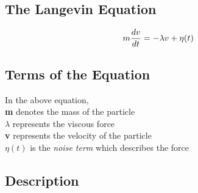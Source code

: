 \subsection{The Langevin Equation}
\begin{equation}
	{\LARGE{{m \frac{dv}{dt} = -\lambda v + \eta(t)}}}
	\label{eq:1}
\end{equation}
\subsection{Terms of the Equation}

{\normalsize{In the above equation,}}\\
{\normalsize {\textbf{m} denotes the mass of the particle }}\\
{\normalsize {\textbf{$ \lambda $ } represents the viscous force }}\\
{\normalsize {\textbf{v} represents the velocity of the particle }}\\
{\normalsize {\textbf{$  \eta (t)$} is the \textit{noise term} which describes the force}}\\

\subsection{Description}

